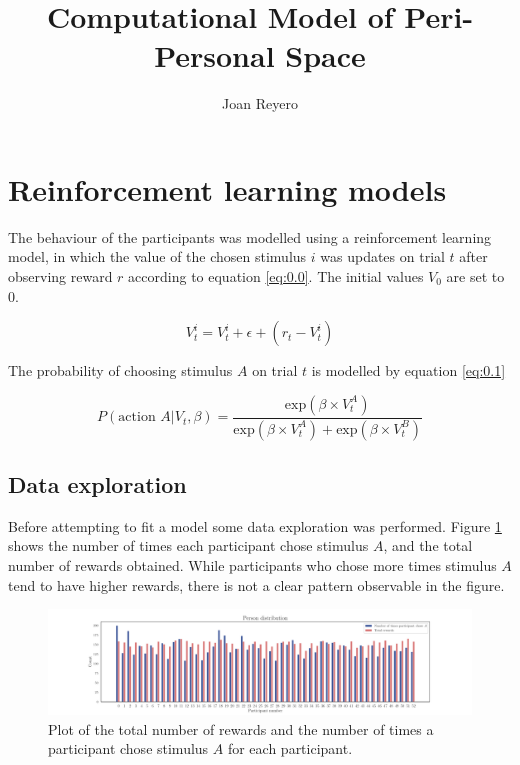 \documentclass[12pt]{article}
\title{Computational Model of Peri-Personal Space}
\author{Joan Reyero}
\begin{document}
\maketitle

\section{Reinforcement learning models}

The behaviour of the participants was modelled using a reinforcement learning model, in which the value of the chosen stimulus $i$ was updates on trial $t$ after observing reward $r$ according to equation \ref{eq:0.0}. The initial values $V_0$ are set to 0.

\begin{equation}
    V_t^i = V_t^i + \epsilon + (r_t - V_t^i)
    \label{eq:0.0}
\end{equation}

The probability of choosing stimulus $A$ on trial $t$ is modelled by equation \ref{eq:0.1}

\begin{equation}
    P(\text{action } A | V_t, \beta) = \frac{\mathrm{exp}(\beta \times V_t^A)}{\mathrm{exp}(\beta \times V_t^A) + \mathrm{exp}(\beta \times V_t^B)}
    \label{eq:0.1}
\end{equation}


\subsection{Data exploration}

Before attempting to fit a model some data exploration was performed. Figure \ref{fig:2.1} shows the number of times each participant chose stimulus $A$, and the total number of rewards obtained. While participants who chose more times stimulus $A$ tend to have higher rewards, there is not a clear pattern observable in the figure. 

\begin{figure}[h!]
	\centering
	\hspace*{-0.6in}
	\includegraphics[width=1.2\linewidth]{figures/2.1.pdf}
	\caption{Plot of the total number of rewards and the number of times a participant chose stimulus $A$ for each participant.}
	\label{fig:2.1}
\end{figure}
\end{document}

